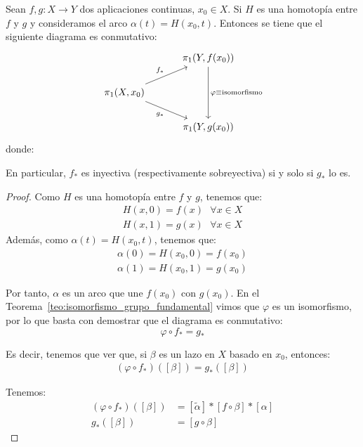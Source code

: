 \begin{lema}\label{lema:homotopia_induce_isomorfismo} %
    Sean $f,g:X\to Y$ dos aplicaciones continuas, $x_0\in X$. Si $H$ es una homotopía entre $f$ y $g$ y consideramos el arco $\alpha(t)=H(x_0, t)$. Entonces 
    se tiene que el siguiente diagrama es conmutativo:
    \[
    \begin{tikzcd}[row sep=1.8em, column sep=3em]
        & \pi_1(Y, f(x_0)) \arrow[dd, "\varphi \equiv \text{isomorfismo}"] \\
        \pi_1(X, x_0) \arrow[ur, "f_*"] \arrow[dr, "g_*"'] & \\
        & \pi_1(Y, g(x_0))
    \end{tikzcd}
    \]
    donde:
    
    En particular, $f_*$ es inyectiva (respectivamente sobreyectiva) si y solo si $g_*$ lo es.

    \begin{proof}
        Como $H$ es una homotopía entre $f$ y $g$, tenemos que:
        \begin{align*}
            H(x,0) = f(x) \ \ \ \forall x\in X\\
            H(x,1) = g(x) \ \ \ \forall x\in X
        \end{align*}
        Además, como $\alpha(t) = H(x_0,t)$, tenemos que:
        \begin{align*}
            \alpha(0) = H(x_0,0) = f(x_0)\\
            \alpha(1) = H(x_0,1) = g(x_0)
        \end{align*}

        Por tanto, $\alpha$ es un arco que une $f(x_0)$ con $g(x_0)$. En el Teorema~\ref{teo:isomorfismo_grupo_fundamental} vimos que $\varphi$ es un isomorfismo, por lo que basta con demostrar que el diagrama es conmutativo:
        \begin{equation*}
            \varphi \circ f_* = g_*
        \end{equation*}

        Es decir, tenemos que ver que, si $\beta$ es un lazo en $X$ basado en $x_0$, entonces:
        \begin{gather*}
            (\varphi \circ f_*) ([\beta]) = g_*([\beta])
        \end{gather*}

        Tenemos:
        \begin{align*}
            (\varphi \circ f_*) ([\beta]) &= \left[\tilde{\alpha}\right] \ast [f\circ \beta] \ast [\alpha]\\
            g_*([\beta]) &= [g\circ \beta]
        \end{align*}


\end{proof}
\end{lema}
